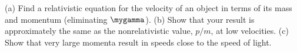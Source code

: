 (a) Find a relativistic equation for the velocity of an
object in terms of its mass and momentum (eliminating
$\mygamma$).\answercheck\hwendpart
(b) Show that your result
is approximately the same as the nonrelativistic value, $p/m$, at
low velocities.\hwendpart
(c) Show that very large momenta result in
speeds close to the speed of light.
